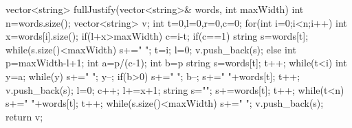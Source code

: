  vector<string> fullJustify(vector<string>& words, int maxWidth) {
        int n=words.size();
        vector<string> v;
        int t=0,l=0,r=0,c=0;
        for(int i=0;i<n;i++)
        {
            int x=words[i].size();            
            if(l+x>maxWidth)
            {
                c=i-t;
                if(c==1)
                {
                    string s=words[t];                   
                    while(s.size()<maxWidth)
                    {
                        s+=" ";
                    }
                    t=i;
                    l=0;
                    v.push_back(s);
                }
                else
                {
                int p=maxWidth-l+1;
                int a=p/(c-1);
                int b=p%
                string s=words[t];
                t++;
                while(t<i)
                {
                    int y=a;
                    while(y)
                    {
                        s+=" ";
                        y--;
                    }
                    if(b>0)
                    {
                        s+=" ";
                        b--;
                    }
                    s+=" "+words[t];                   
                    t++;
                }
                v.push_back(s);
                l=0;
                }
            }
            c++;
            l+=x+1;
        }
        string s="";
        s+=words[t];
        t++;
        while(t<n)
        {
            s+=" "+words[t];
            t++;
        }
        while(s.size()<maxWidth)
        {
            s+=" ";
        }
        v.push_back(s);
        return v;
    }